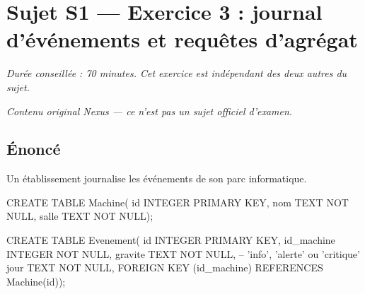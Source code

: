 \section*{Sujet S1 --- Exercice 3 : journal d'événements et requêtes d'agrégat}

\textit{Durée conseillée : 70 minutes. Cet exercice est indépendant des deux
autres du sujet.}

\medskip
\textit{Contenu original Nexus --- ce n'est pas un sujet officiel d'examen.}

\subsection*{Énoncé}

Un établissement journalise les événements de son parc informatique.

\begin{sql}
CREATE TABLE Machine(
    id INTEGER PRIMARY KEY,
    nom TEXT NOT NULL,
    salle TEXT NOT NULL);

CREATE TABLE Evenement(
    id INTEGER PRIMARY KEY,
    id_machine INTEGER NOT NULL,
    gravite TEXT NOT NULL,      -- 'info', 'alerte' ou 'critique'
    jour TEXT NOT NULL,
    FOREIGN KEY (id_machine) REFERENCES Machine(id));
\end{sql}

